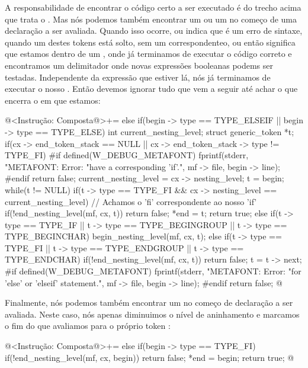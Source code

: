 {{{{{{A responsabilidade de encontrar o código certo a ser executado é do
trecho acima que trata o . Mas nós podemos também
encontrar um  ou um  no começo de
uma declaração a ser avaliada. Quando isso ocorre, ou indica que é um
erro de sintaxe, quando um destes tokens está solto, sem
um  correspondenteo, ou então significa que estamos
dentro de um , onde já terminamos de executar o código
correto e encontramos um delimitador onde novas expressões booleanas
podems ser testadas. Independente da expressão que estiver lá, nós já
terminamos de executar o nosso . Então devemos ignorar
tudo que vem a seguir até achar o  que encerra
o  em que estamos:

\iniciocodigo
@<Instrução: Composta@>+= 
else if(begin -> type == TYPE_ELSEIF || begin -> type == TYPE_ELSE){
  int current_nesting_level;
  struct generic_token *t;
  if(cx -> end_token_stack == NULL ||
     cx -> end_token_stack -> type != TYPE_FI){
#if defined(W_DEBUG_METAFONT)
  fprintf(stderr, "METAFONT: Error: %
          "have a corresponding 'if'.\n", mf -> file,
          begin -> line);
#endif  
    return false;
  }
  current_nesting_level = cx -> nesting_level;
  t = begin;
  while(t != NULL){
    if(t -> type == TYPE_FI && cx -> nesting_level == current_nesting_level){
      // Achamos o 'fi' correspondente ao nosso 'if'
      if(!end_nesting_level(mf, cx, t))
        return false;
      *end = t;
      return true;
    }
    else if(t -> type == TYPE_IF || t -> type == TYPE_BEGINGROUP ||
            t -> type == TYPE_BEGINCHAR)
      begin_nesting_level(mf, cx, t);
    else if(t -> type == TYPE_FI || t -> type == TYPE_ENDGROUP ||
            t -> type == TYPE_ENDCHAR)
      if(!end_nesting_level(mf, cx, t))
        return false;
    t = t -> next;
  }
#if defined(W_DEBUG_METAFONT)
  fprintf(stderr, "METAFONT: Error: %
          "for 'else' or 'elseif' statement.\n", mf -> file,
          begin -> line);
#endif
  return false;
}
@
\fimcodigo

Finalmente, nós podemos também encontrar um  no começo
de declaração a ser avaliada. Neste caso, nós apenas diminuimos o
nível de aninhamento e marcamos o fim do que avaliamos para o próprio
token :

\iniciocodigo
@<Instrução: Composta@>+=
else if(begin -> type == TYPE_FI){
  if(!end_nesting_level(mf, cx, begin))
    return false;
  *end = begin;
  return true;
}
@
\fimcodigo

}}}}}}
